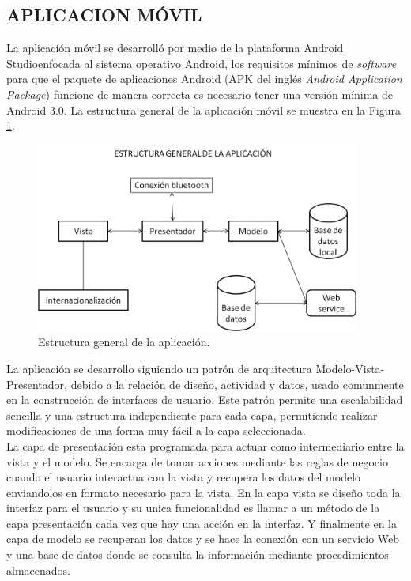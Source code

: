 \subsection{APLICACION MÓVIL}

La aplicación móvil se desarrolló por medio de la plataforma Android Studio\textregistered enfocada al sistema operativo Android, los requisitos mínimos de \textit{software} para que el paquete de aplicaciones Android (APK del inglés \textit{Android Application Package}) funcione de manera correcta es necesario tener una versión mínima de Android 3.0. La estructura general de la aplicación móvil se muestra en la Figura \ref{Mestrucgeral}.\\

%
\begin{figure}[H]
\centering
\includegraphics[width=0.95\textwidth]{metodologia/fig1.png}
\caption{Estructura general de la aplicación.}
\label{Mestrucgeral}
\end{figure}
%


La aplicación se desarrollo siguiendo un patrón de arquitectura Modelo-Vista-Presentador, debido a la relación de diseño, actividad y datos, usado comunmente en la construcción de interfaces de usuario. Este patrón permite una escalabilidad sencilla y una estructura independiente para cada capa, permitiendo realizar modificaciones de una forma muy fácil a la capa seleccionada.\\

La capa de presentación esta programada para actuar como intermediario entre la vista y el modelo.  Se encarga de tomar acciones mediante las reglas de negocio cuando el usuario interactua con la vista y recupera los datos del modelo enviandolos en formato necesario para la vista. En la capa vista se diseño toda la interfaz para el usuario y su unica funcionalidad es llamar a un método de la capa presentación cada vez que hay una acción en la interfaz. Y finalmente en la capa de modelo se recuperan los datos y se hace la conexión con un servicio Web y una base de datos donde se consulta la información mediante procedimientos almacenados.\\

